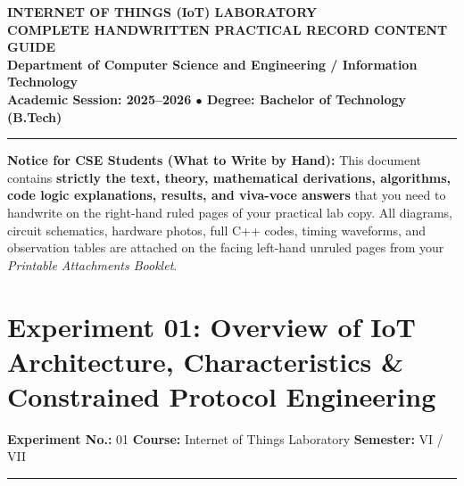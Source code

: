 \documentclass[11pt,a4paper]{article}
\begin{document}
\begin{center}
    {\LARGE\bfseries INTERNET OF THINGS (IoT) LABORATORY}\\[0.12cm]
    {\Large\bfseries COMPLETE HANDWRITTEN PRACTICAL RECORD CONTENT GUIDE}\\[0.15cm]
    {\normalsize\textbf{Department of Computer Science and Engineering / Information Technology}}\\[0.08cm]
    {\footnotesize\textbf{Academic Session: 2025--2026 \quad $\bullet$ \quad Degree: Bachelor of Technology (B.Tech)}}
\end{center}
\vspace{-0.2cm}
\rule{\textwidth}{1.0pt}
\vspace{0.2cm}

\begin{bwcard}
\footnotesize\textbf{Notice for CSE Students (What to Write by Hand):} This document contains \textbf{strictly the text, theory, mathematical derivations, algorithms, code logic explanations, results, and viva-voce answers} that you need to handwrite on the right-hand ruled pages of your practical lab copy. All diagrams, circuit schematics, hardware photos, full C++ codes, timing waveforms, and observation tables are attached on the facing left-hand unruled pages from your \textit{Printable Attachments Booklet}.
\end{bwcard}

\vspace{0.2cm}

\section*{Experiment 01: Overview of IoT Architecture, Characteristics \& Constrained Protocol Engineering}
\noindent\textbf{Experiment No.:} 01 \hfill \textbf{Course:} Internet of Things Laboratory \hfill \textbf{Semester:} VI / VII
\vspace{0.05cm}
\hrule
\vspace{0.25cm}
\end{document}
